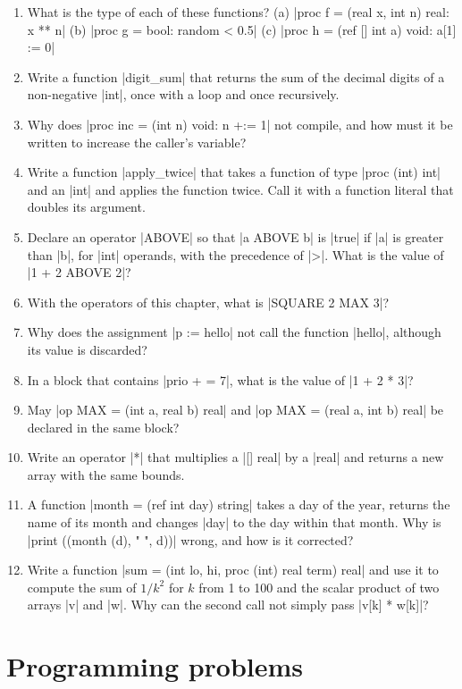 \begin{enumerate}
\item What is the type of each of these functions?
  (a) \code|proc f = (real x, int n) real: x ** n|
  (b) \code|proc g = bool: random < 0.5|
  (c) \code|proc h = (ref [] int a) void: a[1] := 0|
\item Write a function \code|digit_sum| that returns the sum of the
  decimal digits of a non-negative \code|int|, once with a loop and once
  recursively.
\item Why does \code|proc inc = (int n) void: n +:= 1| not compile, and how
  must it be written to increase the caller's variable?
\item Write a function \code|apply_twice| that takes a function of type
  \code|proc (int) int| and an \code|int| and applies the function twice.
  Call it with a function literal that doubles its argument.
\item Declare an operator \code|ABOVE| so that \code|a ABOVE b| is
  \code|true| if \code|a| is greater than \code|b|, for \code|int|
  operands, with the precedence of \code|>|. What is the value of
  \code|1 + 2 ABOVE 2|?
\item With the operators of this chapter, what is \code|SQUARE 2 MAX 3|?
\item Why does the assignment \code|p := hello| not call the function
  \code|hello|, although its value is discarded?
\item In a block that contains \code|prio + = 7|, what is the value of
  \code|1 + 2 * 3|?
\item May \code|op MAX = (int a, real b) real| and
  \code|op MAX = (real a, int b) real| be declared in the same block?
\item Write an operator \code|*| that multiplies a \code|[] real| by a
  \code|real| and returns a new array with the same bounds.
\item A function \code|month = (ref int day) string| takes a day of the
  year, returns the name of its month and changes \code|day| to the day
  within that month. Why is \code|print ((month (d), " ", d))| wrong, and
  how is it corrected?
\item Write a function \code|sum = (int lo, hi, proc (int) real term) real|
  and use it to compute the sum of $1/k^2$ for $k$ from 1 to 100 and the scalar product of
  two arrays \code|v| and \code|w|. Why can the second call not simply
  pass \code|v[k] * w[k]|?
\end{enumerate}

\section*{Programming problems}

